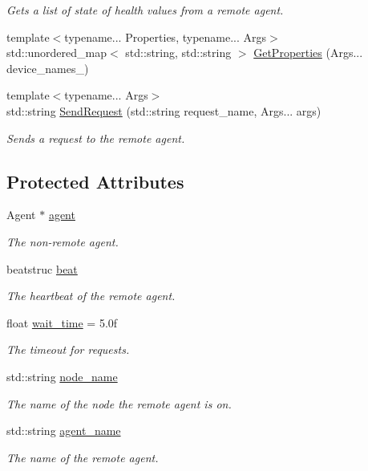 \begin{DoxyCompactItemize}
\begin{DoxyCompactList}\small\item\em Gets a list of state of health values from a remote agent. \end{DoxyCompactList}\item 
{\footnotesize template$<$typename... Properties, typename... Args$>$ }\\std\+::unordered\+\_\+map$<$ std\+::string, std\+::string $>$ \hyperlink{classcubesat_1_1RemoteAgent_a08ff2ce8cd3114533ea51959f3f8c9ef}{Get\+Properties} (Args... device\+\_\+names\+\_\+)
\item 
{\footnotesize template$<$typename... Args$>$ }\\std\+::string \hyperlink{classcubesat_1_1RemoteAgent_a480b864cabc5b9f5b69833a3bc1c1d2f}{Send\+Request} (std\+::string request\+\_\+name, Args... args)
\begin{DoxyCompactList}\small\item\em Sends a request to the remote agent. \end{DoxyCompactList}\end{DoxyCompactItemize}
\subsection*{Protected Attributes}
\begin{DoxyCompactItemize}
\item 
Agent $\ast$ \hyperlink{classcubesat_1_1RemoteAgent_ab6ebf279927e308af1ecaf81782af2a3}{agent}
\begin{DoxyCompactList}\small\item\em The non-\/remote agent. \end{DoxyCompactList}\item 
beatstruc \hyperlink{classcubesat_1_1RemoteAgent_a56c2e7d52e3ebe7dfe69c4a779f1a375}{beat}
\begin{DoxyCompactList}\small\item\em The heartbeat of the remote agent. \end{DoxyCompactList}\item 
float \hyperlink{classcubesat_1_1RemoteAgent_a22d81c0c42adb6cef33cdef627631f43}{wait\+\_\+time} = 5.\+0f
\begin{DoxyCompactList}\small\item\em The timeout for requests. \end{DoxyCompactList}\item 
std\+::string \hyperlink{classcubesat_1_1RemoteAgent_ad53ce2f7c8bbe8e8582f82740d5c38fe}{node\+\_\+name}
\begin{DoxyCompactList}\small\item\em The name of the node the remote agent is on. \end{DoxyCompactList}\item 
std\+::string \hyperlink{classcubesat_1_1RemoteAgent_a11c308db5679e300962e8a79b875dba5}{agent\+\_\+name}
\begin{DoxyCompactList}\small\item\em The name of the remote agent. \end{DoxyCompactList}\end{DoxyCompactItemize}


